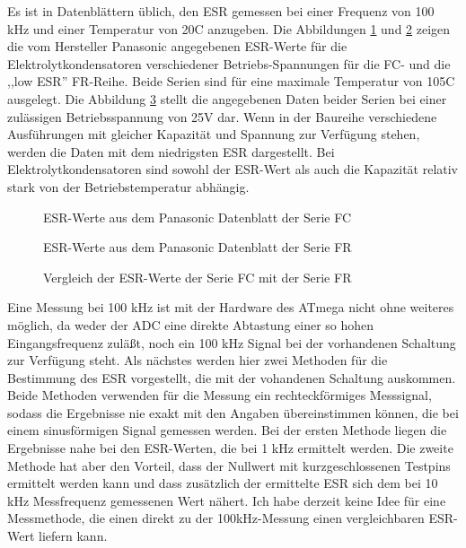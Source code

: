 Es ist in Datenblättern üblich, den ESR gemessen bei einer Frequenz von 100 kHz und
einer Temperatur von 20\textdegree C anzugeben.
Die Abbildungen \ref{fig:Cap_FC_data} und \ref{fig:Cap_FR_data} zeigen die vom Hersteller Panasonic 
angegebenen ESR-Werte für die Elektrolytkondensatoren verschiedener Betriebs-Spannungen für die FC- und die ,,low ESR'' FR-Reihe.
Beide Serien sind für eine maximale Temperatur von 105\textdegree C ausgelegt.
Die Abbildung \ref{fig:Cap_FC_FR_data} stellt die angegebenen Daten beider Serien bei einer zulässigen Betriebsspannung
von 25V dar. Wenn in der Baureihe verschiedene Ausführungen mit gleicher Kapazität und Spannung zur Verfügung stehen,
werden die Daten mit dem niedrigsten ESR dargestellt.
Bei Elektrolytkondensatoren sind sowohl der ESR-Wert als auch die Kapazität relativ stark von der Betriebstemperatur
abhängig.

\begin{figure}[H]
  \centering
    \resizebox{14cm}{!}{}
  \caption{ESR-Werte aus dem Panasonic Datenblatt der Serie FC}
  \label{fig:Cap_FC_data}
\end{figure}

\begin{figure}[H]
  \centering
    \resizebox{14cm}{!}{}
  \caption{ESR-Werte aus dem Panasonic Datenblatt der Serie FR}
  \label{fig:Cap_FR_data}
\end{figure}

\begin{figure}[H]
  \centering
    \resizebox{14cm}{!}{}
  \caption{Vergleich der ESR-Werte der Serie FC mit der Serie FR}
  \label{fig:Cap_FC_FR_data}
\end{figure}

Eine Messung bei 100 kHz ist mit der Hardware des ATmega nicht ohne weiteres möglich, da weder der ADC
eine direkte Abtastung einer so hohen Eingangsfrequenz zuläßt, noch ein 100 kHz Signal bei der vorhandenen Schaltung zur
Verfügung steht. 
Als nächstes werden hier zwei Methoden für die Bestimmung des ESR vorgestellt, die mit der vohandenen
Schaltung auskommen. 
Beide Methoden verwenden für die Messung ein rechteckförmiges Messsignal, sodass die Ergebnisse nie
exakt mit den Angaben übereinstimmen können, die bei einem sinusförmigen Signal gemessen werden.
Bei der ersten Methode liegen die Ergebnisse nahe bei den ESR-Werten, die bei 1 kHz ermittelt werden.
Die zweite Methode hat aber den Vorteil, dass der Nullwert mit kurzgeschlossenen Testpins ermittelt werden kann
und dass zusätzlich der ermittelte ESR sich dem bei 10 kHz Messfrequenz gemessenen Wert nähert.
Ich habe derzeit keine Idee für eine Messmethode, die einen direkt zu der 100kHz-Messung einen 
vergleichbaren ESR-Wert liefern kann.

